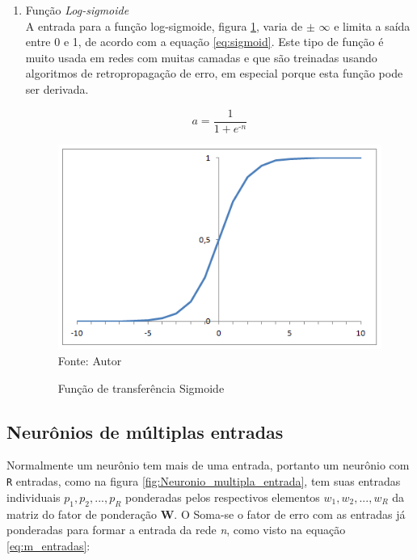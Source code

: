 \documentclass[
	12pt,				%
    oneside,			%
	a4paper,			%
	english,			%
	french,				%
	spanish,			%
	brazil,				%
	]{abntex2}
\begin{document}
\begin{enumerate}
  \item Função \textit{Log-sigmoide}\\
  A entrada para a função log-sigmoide, figura \ref{fig:Sigmoid}, varia de $\pm$  $\infty$ e limita a saída entre 0 e 1, de acordo com a equação \ref{eq:sigmoid}. Este tipo de função é muito usada em redes com muitas camadas e que são treinadas usando algoritmos de retropropagação de erro, em especial porque esta função pode ser derivada.
  
  
  \begin{equation}
    a = \frac{1}{1+\textit{$e^\textit{-n}$}}
    \label{eq:sigmoid}
  \end{equation}
  
  \begin{figure}[H]
    \centering
    \caption{Função de transferência Sigmoide}
    \includegraphics[scale=0.75]{Sigmoid}\\
    Fonte: Autor\hfill
    \label{fig:Sigmoid}
\end{figure}
  
\end{enumerate}


\subsection {Neurônios de múltiplas entradas}

Normalmente um neurônio tem mais de uma entrada, portanto um neurônio com \texttt{R} entradas, como na figura \ref{fig:Neuronio_multipla_entrada}, tem suas entradas individuais \textit{\(p_1, p_2,...,p_R \)}  ponderadas pelos respectivos elementos \textit{\(w_1, w_2,...,w_R \)} da matriz do fator de ponderação \textbf{W}. O Soma-se o fator de erro com as entradas já ponderadas para formar a entrada da rede \textit{n}, como visto na equação \ref{eq:m_entradas}: 
\end{document}
